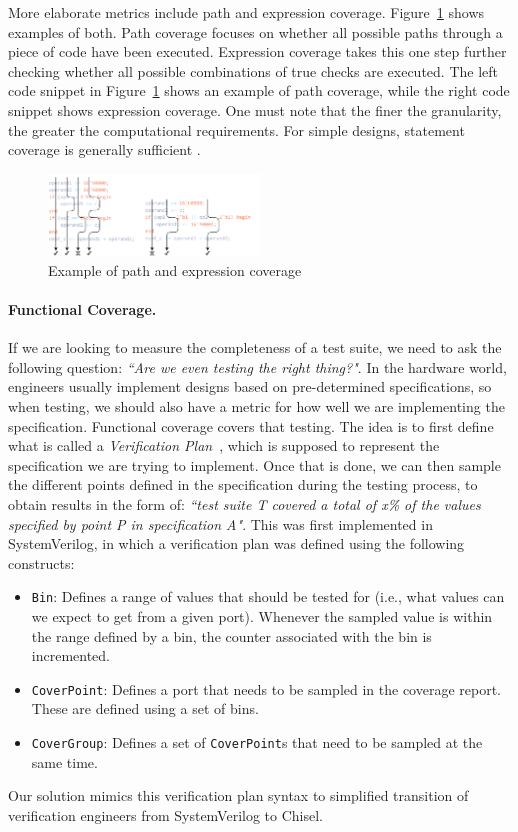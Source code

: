\documentclass[conference]{IEEEtran}
\begin{document}
More elaborate metrics include path and expression coverage. Figure~\ref{fig:expr} shows examples of both. Path coverage focuses on whether all possible paths through a piece of code have been executed. 
Expression coverage takes this one step further checking whether all possible combinations of true checks are executed. The left code snippet in Figure~\ref{fig:expr} shows an example of path coverage, while the right code snippet shows expression coverage. One must note that the finer the granularity, the greater the computational requirements. For simple designs, statement coverage is generally sufficient \cite{hdlverify}.

\begin{figure}
    \centering
    \includegraphics[width=0.5\textwidth]{Coverage_example.pdf}
    \caption{Example of path and expression coverage}
\label{fig:expr}
\end{figure}

\paragraph{Functional Coverage.} If we are looking to measure the completeness of a test suite, we need to ask the following question: \textit{``Are we even testing the right thing?"}. In the hardware world, engineers usually implement designs based on pre-determined specifications, so when testing, we should also have a metric for how well we are implementing the specification. Functional coverage covers that testing. The idea is to first define what is called a \textit{Verification Plan}~\cite{spear2008systemverilog}, which is supposed to represent the specification we are trying to implement. Once that is done, we can then sample the different points defined in the specification during the testing process, to obtain results in the form of: \textit{``test suite T covered a total of x\% of the values specified by point P in specification A"}. This was first implemented in SystemVerilog, in which a verification plan was defined using the following constructs:  
\begin{itemize}
\item \texttt{Bin}: Defines a range of values that should be tested for (i.e., what values can we expect to get from a given port). Whenever the sampled value is within the range defined by a bin, the counter associated with the bin is incremented.
\item \texttt{CoverPoint}: Defines a port that needs to be sampled in the coverage report. These are defined using a set of bins.
\item \texttt{CoverGroup}: Defines a set of \texttt{CoverPoint}s that need to be sampled at the same time.
\end{itemize}
Our solution mimics this verification plan syntax to simplified transition of verification engineers from SystemVerilog to Chisel.
\end{document}
